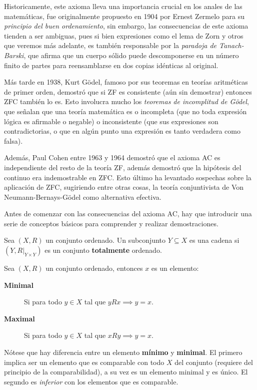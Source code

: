 \documentclass[11pt,oneside,a4paper]{book}
\begin{document}
Historicamente, este axioma lleva una importancia crucial en los anales de las matemáticas, fue originalmente propuesto en 1904 por Ernest Zermelo para su \textit{principio del buen ordenamiento}, sin embargo, las consecuencias de este axioma tienden a ser ambiguas, pues si bien expresiones como el lema de Zorn y otros que veremos más adelante, es también responsable por la \textit{paradoja de Tanach-Barski}, que afirma que un cuerpo sólido puede descomponerse en un número finito de partes para reensamblarse en dos copias idénticas al original.

Más tarde en 1938, Kurt Gödel, famoso por sus teoremas en teorías aritméticas de primer orden, demostró que si ZF es consistente (aún sin demostrar) entonces ZFC también lo es. Esto involucra mucho los \textit{teoremas de incomplitud de Gödel}, que señalan que una teoría matemática es o incompleta (que no toda expresión lógica es afirmable o negable) o inconsistente (que sus expresiones son contradictorias, o que en algún punto una expresión es tanto verdadera como falsa).

Además, Paul Cohen entre 1963 y 1964 demostró que el axioma AC es independiente del resto de la teoría ZF, además demostró que la hipótesis del continuo era indemostrable en ZFC. Esto último ha levantado sospechas sobre la aplicación de ZFC, sugiriendo entre otras cosas, la teoría conjuntivista de Von Neumann-Bernays-Gödel como alternativa efectiva.

Antes de comenzar con las consecuencias del axioma AC, hay que introducir una serie de conceptos básicos para comprender y realizar demostraciones.
\begin{mydef}[Cadena]
Sea $(X,R)$ un conjunto ordenado. Un subconjunto $Y\subseteq X$ es una cadena si $(Y,R|_{Y\times Y})$ es un conjunto \textbf{totalmente} ordenado.
\end{mydef}
\begin{mydef}
Sea $(X,R)$ un conjunto ordenado, entonces $x$ es un elemento:
\begin{description}
\item[\bf Minimal] Si para todo $y\in X$ tal que $yRx\implies y=x$.
\item[\bf Maximal] Si para todo $y\in X$ tal que $xRy\implies y=x$.
\end{description}
\end{mydef}
Nótese que hay diferencia entre un elemento \textbf{mínimo} y \textbf{minimal}. El primero implica ser un elemento que es comparable con todo $X$ del conjunto (requiere del principio de la comparabilidad), a su vez es un elemento minimal y es único. El segundo es \textit{inferior} con los elementos que es comparable.
\end{document}
